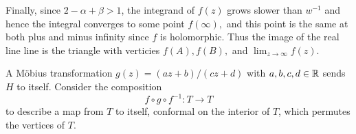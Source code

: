 \documentclass{homework}
\begin{document}
\begin{solution}
                                                                                                        Finally, since $2 - \alpha + \beta > 1$, the integrand of $f(z)$ grows slower than $w^{-1}$ and hence the integral converges to some point $f(\infty),$ and this point is the same at both plus and minus infinity since $f$ is holomorphic. Thus the image of the real line line is the triangle with verticies $f(A), f(B),$ and $\lim_{z\to\infty} f(z).$
                                                                                                        \end{solution}
                                                                                                        \begin{problem}
                                                                                                          A M\"obius transformation $g(z) = (az + b)/(cz + d)$ with
                                                                                                            $a,b,c,d \in \mathbb{R}$ sends $H$ to itself.  Consider the composition
                                                                                                              \[
                                                                                                                  f \circ g \circ f^{-1} : T \to T
                                                                                                                    \]
                                                                                                                      to describe a map from $T$ to itself, conformal on the interior of
                                                                                                                        $T$, which permutes the vertices of $T$.
                                                                                                                        \end{problem}
\end{document}
